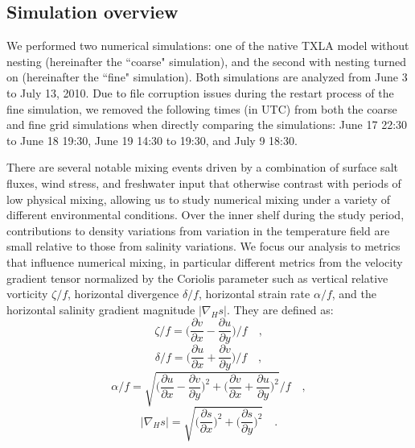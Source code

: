 \subsection{Simulation overview}

We performed two numerical simulations: one of the native TXLA model without nesting (hereinafter the ``coarse" simulation), and the second with nesting turned on (hereinafter the ``fine" simulation). Both simulations are analyzed from June 3 to July 13, 2010. Due to file corruption issues during the restart process of the fine simulation, we removed the following times (in UTC) from both the coarse and fine grid simulations when directly comparing the simulations: June 17 22:30 to June 18 19:30, June 19 14:30 to 19:30, and July 9 18:30. 

There are several notable mixing events driven by a combination of surface salt fluxes, wind stress, and freshwater input that otherwise contrast with periods of low physical mixing, allowing us to study numerical mixing under a variety of different environmental conditions. Over the inner shelf during the study period, contributions to density variations from variation in the temperature field are small relative to those from salinity variations. We focus our analysis to metrics that influence numerical mixing, in particular different metrics from the velocity gradient tensor normalized by the Coriolis parameter such as vertical relative vorticity $\zeta/f$, horizontal divergence $\delta/f$, horizontal strain rate $\alpha/f$, and the horizontal salinity gradient magnitude $|\nabla_H s|$. They are defined as:
\begin{equation}
    \zeta/f = \bigg(\frac{\partial v}{\partial x} - \frac{\partial u}{\partial y}\bigg)/f \quad ,
\end{equation}
\begin{equation}
    \delta/f = \bigg(\frac{\partial u}{\partial x} + \frac{\partial v}{\partial y}\bigg)/f \quad ,
\end{equation}
\begin{equation}
    \alpha/f = \sqrt{\bigg(\frac{\partial u}{\partial x} - \frac{\partial v}{\partial y}\bigg)^2+\bigg(\frac{\partial v}{\partial x} + \frac{\partial u}{\partial y}\bigg)^2}/f \quad ,
\end{equation}
\begin{equation}
    |\nabla_H s| = \sqrt{\bigg(\frac{\partial s}{\partial x} \bigg) ^2 + \bigg(\frac{\partial s}{\partial y} \bigg)^2} \quad .
\end{equation}
